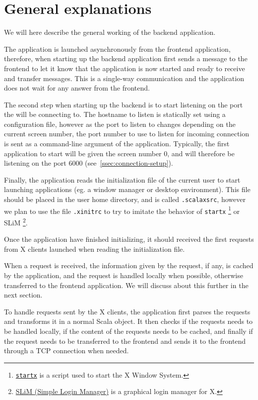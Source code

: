 \section{General explanations}
%
We will here describe the general working of the backend application.

The application is launched asynchronously from the frontend application, 
therefore, when starting up the backend application first sends a message to 
the frontend to let it know that the application is now started and ready to 
receive and transfer messages. This is a single-way communication and the 
application does not wait for any answer from the frontend.

The second step when starting up the backend is to start listening on the 
port the  will be connecting to. The hostname 
to listen is statically set using a configuration file, however as the port 
to listen to changes depending on the current screen number, the port number to 
use to listen for incoming connection is sent as a command-line argument of the 
application. Typically, the first application to start will be given the 
screen number $0$, and will therefore be listening on the port $6000$ 
(see~\ref{ssec:connection-setup}).

Finally, the application reads the initialization file of the current user 
to start launching applications (eg. a window manager or desktop environment). 
This file should be placed in the user home directory, and is called 
\lstinline{.scalaxsrc}, however we plan to use the file \lstinline{.xinitrc} to 
try to imitate the behavior of \lstinline{startx}
\footnote{\href{http://linux.die.net/man/1/startx}{\lstinline{startx}} is a script used to start the X Window System.}
or SLiM
\footnote{\href{http://slim.berlios.de/}{SLiM (Simple Login Manager)} is a graphical login manager for X.}.

Once the application have finished initializing, it should received the first requests 
from X clients launched when reading the initialization file.

When a request is received, the information given by the request, if any, is cached 
by the application, and the request is handled locally when possible, otherwise 
transferred to the frontend application. We will discuss about this further in the next 
section.

To handle requests sent by the X clients, the application first parses the requests and 
transforms it in a normal Scala object. It then checks if the requests needs to be handled 
locally, if the content of the requests needs to be cached, and finally if the request 
needs to be transferred to the frontend and sends it to the frontend through a TCP connection 
when needed.